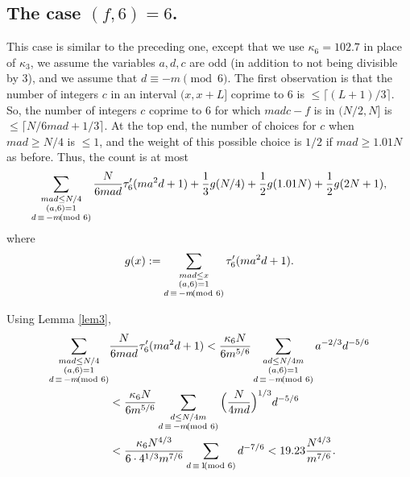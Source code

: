 \documentclass[12pt]{amsart}
\theoremstyle{definition}
\theoremstyle{remark}
\numberwithin{equation}{section}
\begin{document}
\subsection{The case $(f,6)=6$.}
This case is similar to the preceding one, except that we use $\kappa_6=102.7$ in
place of $\kappa_3$, we assume the variables $a,d,c$ are odd (in addition to not
being divisible by 3), and we assume that $d\equiv-m\pmod6$.  The first observation
is that the number of integers $c$ in an interval $(x,x+L]$ coprime to 6 is $\le\lceil(L+1)/3\rceil$.
So, the number of integers $c$ coprime to 6 for which $madc-f$ is in $(N/2,N]$ is $\le\lceil N/6mad+1/3\rceil$.  At the top end, the number of choices for $c$ when $mad\ge N/4$ is $\le 1$,
and the weight of this possible choice is $1/2$ if $mad\ge1.01N$ as before.  Thus, the count is
at most
\begin{equation}
\label{eq:gcd6}
\sum_{\substack{mad\le N/4\\(a,6)=1\\d\,\equiv\,-m\kern-5pt\pmod6}}
\frac N{6mad}\tau'_6(ma^2d+1)
+\frac13g(N/4)+\frac12g(1.01N)+\frac12g(2N+1),
\end{equation}
where
\[
g(x):=
\sum_{\substack{mad\le x\\(a,6)=1\\d\,\equiv\,-m\kern-5pt\pmod6}}
\tau'_6(ma^2d+1).
\]

Using Lemma \ref{lem3},
\begin{align*}
\sum_{\substack{mad\le N/4\\(a,6)=1\\d\,\equiv\,-m\kern-5pt\pmod6}}
&\frac N{6mad}\tau'_6(ma^2d+1)
<\frac{\kappa_6 N}{6m^{5/6}}\sum_{\substack{ad\le N/4m\\(a,6)=1\\d\,\equiv\,-m\kern-5pt\pmod6}}
a^{-2/3}d^{-5/6}\\
&<\frac{\kappa_6 N}{6m^{5/6}}\sum_{\substack{d\le N/4m\\d\,\equiv\,-m\kern-5pt\pmod6}}
\Big(\frac{N}{4md}\Big)^{1/3}d^{-5/6}\\
&<\frac{\kappa_6 N^{4/3}}{6\cdot4^{1/3}m^{7/6}}\sum_{d\,\equiv\,1\kern-5pt\pmod6}d^{-7/6}
<19.23\frac{N^{4/3}}{m^{7/6}}.
\end{align*}
\end{document}
